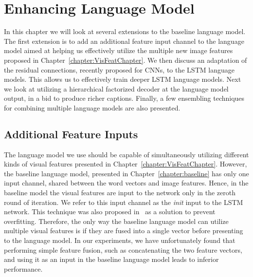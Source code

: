 \chapter{Enhancing Language Model}
\label{chapter:langModel}
In this chapter we will look at several extensions to the baseline language
model.
The first extension is to add an additional feature input channel to the
language model aimed at helping us effectively utilize the multiple new image
features proposed in Chapter~\ref{chapter:VisFeatChapter}.
We then discuss an adaptation of the residual connections, recently proposed for
CNNs, to the LSTM language models.
This allows us to effectively train deeper LSTM language models.
Next we look at utilizing a hierarchical factorized decoder at the language
model output, in a bid to produce richer captions.
Finally, a few ensembling techniques for combining multiple language models are
also presented.

\section{Additional Feature Inputs}
The language model we use should be capable of simultaneously utilizing
different kinds of visual features presented in
Chapter~\ref{chapter:VisFeatChapter}.
However, the baseline language model, presented in Chapter~\ref{chapter:baseline} has
only one input channel, shared between the word vectors and image features.
Hence, in the baseline model the visual features are input to the network only
in the zeroth round of iteration.
We refer to this input channel as the \emph{init} input to the LSTM network.
This technique was also proposed in~\cite{Vinyals_2015_CVPR} as a solution to
prevent overfitting. 
Therefore, the only way the baseline language model can utilize multiple visual
features is if they are fused into a single vector before presenting to the
language model.
In our experiments, we have unfortunately found that performing simple feature
fusion, such as concatenating the two feature vectors, and using it as an input
in the baseline language model leads to inferior performance.

